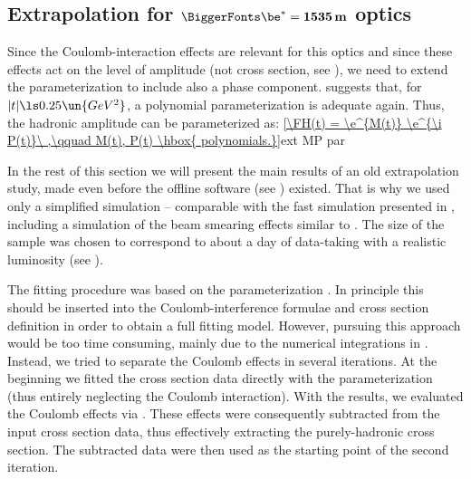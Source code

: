 \eject

\def\OutlineLabel{Extrapolation for beta* = 1535 m optics}
\def\TOCLabel{Extrapolation for $\be^* = 1535$ m optics}
\subsection{Extrapolation for $\BiggerFonts\mathbf{\be^* = 1535\,m}$ optics}

Since the Coulomb-interaction effects are relevant for this optics and since these effects act on the level of amplitude (not cross section, see ), we need to extend the parameterization  to include also a phase component.  suggests that, for $|t| \ls 0.25\un{GeV^2}$, a polynomial parameterization is adequate again. Thus, the hadronic amplitude can be parameterized as:
\eqref{\FH(t) = \e^{M(t)} \e^{\i P(t)}\ ,\qquad M(t), P(t) \hbox{ polynomials.}}{ext MP par}

In the rest of this section we will present the main results of an old extrapolation study, made even before the  offline software (see ) existed. That is why we used only a simplified  simulation -- comparable with the fast simulation presented in , including a simulation of the beam smearing effects similar to . The size of the  sample was chosen to correspond to about a day of data-taking with a realistic luminosity (see ).

The fitting procedure was based on the parameterization . In principle this should be inserted into the Coulomb-interference formulae  and cross section definition  in order to obtain a full fitting model. However, pursuing this approach would be too time consuming, mainly due to the numerical integrations in . Instead, we tried to separate the Coulomb effects in several iterations. At the beginning we fitted the cross section data directly with the parameterization  (thus entirely neglecting the Coulomb interaction). With the results, we evaluated the Coulomb effects via . These effects were consequently subtracted from the input cross section data, thus effectively extracting the purely-hadronic cross section. The subtracted data were then used as the starting point of the second iteration.


